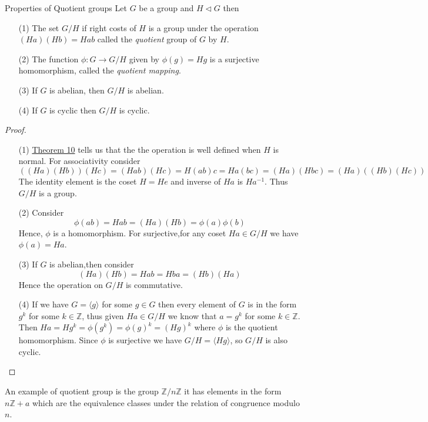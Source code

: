\documentclass[16pt,a4paper]{article}
\theoremstyle{definition}
\newcommand{\ang}[1]{\langle #1 \rangle}
\begin{document}
\begin{thm}{Properties of Quotient groups}{}
Let $G$ be a group and $H\lhd G$ then
\begin{itemize}
\item[(1)] The set $G/H$ if right costs of $H$ is a group under the operation $(Ha)(Hb) = Hab$ called the \emph{quotient} group of $G$ by $H$.  

\item[(2)] The function $\phi : G\rightarrow G/H$ given by $\phi(g) = Hg$ is a surjective homomorphism, called the \emph{quotient mapping}. 

\item[(3)] If $G$ is abelian, then $G/H$ is abelian. 

\item[(4)] If $G$ is cyclic then $G/H$ is cyclic. 

\end{itemize}
\end{thm} 
\begin{proof}
\begin{itemize}
\item[(1)] \hyperref[well-def]{Theorem 10} tells us that the the operation is well defined when $H$ is normal. For associativity consider 
\[((Ha)(Hb))(Hc) = (Hab)(Hc) = H(ab)c = Ha(bc) = (Ha)(Hbc) = (Ha)((Hb)(Hc))\]
The identity element is the coset $H=He$ and inverse of $Ha$ is $Ha^{-1}$. Thus $G/H$ is a group. 
\newpage
\item[(2)] Consider
 \[\phi(ab) = Hab = (Ha)(Hb) = \phi(a)\phi(b)\]
 Hence, $\phi$ is a homomorphism. For surjective,for any coset $Ha \in G/H$ we have $\phi(a) = Ha$. 

\item[(3)] If $G$ is abelian,then consider 
\[(Ha)(Hb) = Hab = Hba = (Hb)(Ha)\] 
 Hence the operation on $G/H$ is commutative. 
 
 \item[(4)] If we have $G=\ang{g}$ for some $g\in G$ then every element of $G$ is in the form $g^k$ for some $k\in \mathbb{Z}$, thus given $Ha\in G/H$ we know that $a=g^k$ for some $k\in \mathbb{Z}$. Then $Ha = Hg^k = \phi(g^k) = \phi(g)^k = (Hg)^{k}$ where $\phi$ is the quotient homomorphism. Since $\phi$ is surjective we have $G/H = \ang{Hg}$, so $G/H$ is also cyclic. 
\end{itemize}
\end{proof}
An example of quotient group is the group $\mathbb{Z}/n\mathbb{Z}$ it has elements in the form $n\mathbb{Z}+a$ which are the equivalence classes under the relation of congruence modulo $n$.
\\
\end{document}
